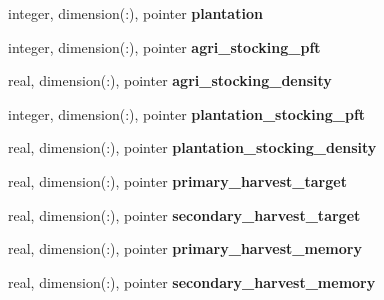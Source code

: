 \begin{DoxyCompactItemize}
\item 
\hypertarget{structed__state__vars_1_1polygontype_ae6d358ad1ec7472883f8341d394128b6}{
integer, dimension(:), pointer {\bfseries plantation}}
\label{structed__state__vars_1_1polygontype_ae6d358ad1ec7472883f8341d394128b6}

\item 
\hypertarget{structed__state__vars_1_1polygontype_a34e4ecafd79103604fb4aa8ade30fb85}{
integer, dimension(:), pointer {\bfseries agri\_\-stocking\_\-pft}}
\label{structed__state__vars_1_1polygontype_a34e4ecafd79103604fb4aa8ade30fb85}

\item 
\hypertarget{structed__state__vars_1_1polygontype_aa1659ad6ccd10ee173da95b567c6eb3f}{
real, dimension(:), pointer {\bfseries agri\_\-stocking\_\-density}}
\label{structed__state__vars_1_1polygontype_aa1659ad6ccd10ee173da95b567c6eb3f}

\item 
\hypertarget{structed__state__vars_1_1polygontype_a3343a024ffaa8d95a4d6cea1fb5a2aa0}{
integer, dimension(:), pointer {\bfseries plantation\_\-stocking\_\-pft}}
\label{structed__state__vars_1_1polygontype_a3343a024ffaa8d95a4d6cea1fb5a2aa0}

\item 
\hypertarget{structed__state__vars_1_1polygontype_a8fd3006496803c1d297445d8d449102c}{
real, dimension(:), pointer {\bfseries plantation\_\-stocking\_\-density}}
\label{structed__state__vars_1_1polygontype_a8fd3006496803c1d297445d8d449102c}

\item 
\hypertarget{structed__state__vars_1_1polygontype_a0ccfc6ae5deda166559de9d757c905e3}{
real, dimension(:), pointer {\bfseries primary\_\-harvest\_\-target}}
\label{structed__state__vars_1_1polygontype_a0ccfc6ae5deda166559de9d757c905e3}

\item 
\hypertarget{structed__state__vars_1_1polygontype_aaa42b67817c0c335612a99738781c5b8}{
real, dimension(:), pointer {\bfseries secondary\_\-harvest\_\-target}}
\label{structed__state__vars_1_1polygontype_aaa42b67817c0c335612a99738781c5b8}

\item 
\hypertarget{structed__state__vars_1_1polygontype_ac9bd109cd790514c44414d0df0b87edb}{
real, dimension(:), pointer {\bfseries primary\_\-harvest\_\-memory}}
\label{structed__state__vars_1_1polygontype_ac9bd109cd790514c44414d0df0b87edb}

\item 
\hypertarget{structed__state__vars_1_1polygontype_a7dce82160ea0c6a6378d0524165b2071}{
real, dimension(:), pointer {\bfseries secondary\_\-harvest\_\-memory}}
\label{structed__state__vars_1_1polygontype_a7dce82160ea0c6a6378d0524165b2071}


\end{DoxyCompactItemize}
